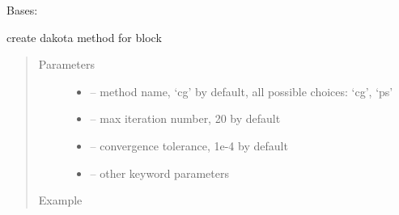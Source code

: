 \documentclass[letterpaper,10pt,english]{sphinxmanual}
\begin{document}
\begin{fulllineitems}
\label{\detokenize{src/apidocs/genopt:genopt.DakotaMethod}}
Bases: \href{https://docs.python.org/2/library/functions.html\#object}{}

create dakota method for  block
\begin{quote}\begin{description}
\item[{Parameters}] \leavevmode\begin{itemize}
\item {} 
 -- method name, `cg' by default, all possible choices: `cg', `ps'

\item {} 
 -- max iteration number, 20 by default

\item {} 
 -- convergence tolerance, 1e-4 by default

\item {} 
 -- other keyword parameters

\end{itemize}

\item[{Example}] \leavevmode
\end{description}\end{quote}


\end{fulllineitems}
\end{document}
